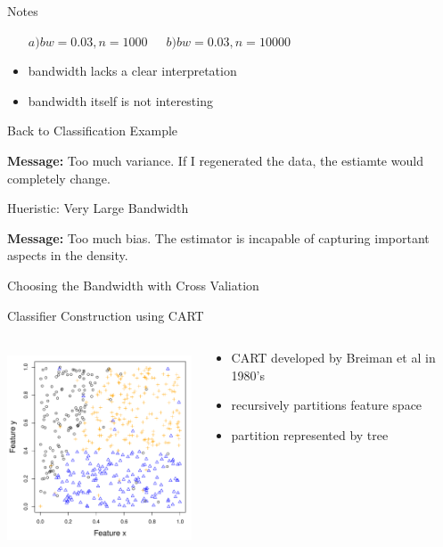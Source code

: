 \documentclass[12pt]{beamer}
\begin{document}
\begin{frame}{Notes}
\begin{itemize}
\begin{center}
      $a) bw=0.03, n = 1000 \, \, \, \, \,  \, \, \, \, b) bw=0.03, n=10000$
    \end{center}
  \item bandwidth lacks a clear interpretation
  \item bandwidth itself is not interesting
  \end{itemize}
\end{frame}





\begin{frame}{Back to Classification Example}

    \textbf{Message:} Too much variance. If I regenerated the data, the estiamte would completely change.
\end{frame}


\begin{frame}{Hueristic: Very Large Bandwidth}


  \textbf{Message:} Too much bias. The estimator is incapable of capturing important aspects in the density.
\end{frame}


\begin{frame}{Choosing the Bandwidth with Cross Valiation}

\end{frame}





\begin{frame}{Classifier Construction using CART}
\begin{columns}[T] %

\begin{column}{.5\textwidth}
\includegraphics[height=2.3in,width=2.3in]{figs/sim_features.pdf}
\end{column}
\begin{column}{.5\textwidth}
\begin{itemize}
\item CART developed by Breiman et al in 1980's \cite{breiman1984classification}
\item recursively partitions feature space
\item partition represented by tree
\end{itemize}
\end{column}


\end{columns}
\end{frame}
\end{document}
